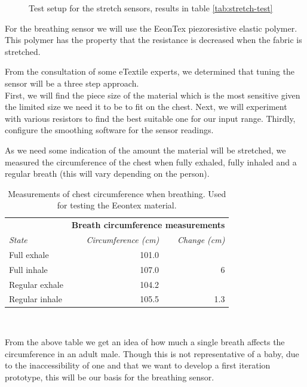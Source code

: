 \documentclass{sigchi-ext}
\begin{document}
{{\begin{minipage}{0.925\marginparwidth}
\begin{figure} [H]
    \caption{Test setup for the stretch sensors, results in table \ref{tab:stretch-test}}
\end{figure}
    \end{minipage}}\label{sec:sidebar} }

For the breathing sensor we will use the EeonTex piezoresistive elastic polymer.
This polymer has the property that the resistance is decreased when the fabric
is stretched.

From the consultation of some eTextile experts, we determined
that tuning the sensor will be a three step approach.\\
First, we will find the piece size of the material which
is the most sensitive given the limited size we need it to be
to fit on the chest. Next, we will experiment with various
resistors to find the best suitable one for our input range.
Thirdly, configure the smoothing software for the sensor readings.

As we need some indication of the amount the material will
be stretched, we measured the circumference of the chest
when fully exhaled, fully inhaled and a regular breath
(this will vary depending on the person).
\begin{table}[H]
  \centering
  \begin{tabular}{l r r}
    & \multicolumn{2}{r}{\small{\textbf{Breath circumference measurements}}} \\
    \cmidrule(r){2-3}
    {\small\textit{State}}
    & {\small \textit{Circumference (cm)}}
    & {\small \textit{Change (cm)}}\\
    \midrule
    Full exhale    & 101.0 & \\
    Full inhale    & 107.0 & 6\\
    Regular exhale & 104.2 & \\
    Regular inhale & 105.5 & 1.3 \\
  \end{tabular}
  \caption{Measurements of chest circumference when breathing. Used for testing the Eeontex material.}~\label{tab:circumference}
\end{table}
From the above table we get an idea of how much a single breath affects the circumference
in an adult male. Though this is not representative of a baby, due to the
inaccessibility of one and that we want to develop a first iteration prototype, this
will be our basis for the breathing sensor.
\end{document}
